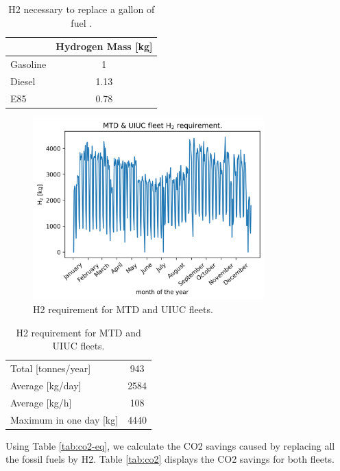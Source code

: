 \documentclass[11pt,letterpaper]{article}
\begin{document}
	\begin{table}[htbp!]
	\centering
	\caption{\gls{H2} necessary to replace a gallon of fuel \cite{doe_office_of_energy_efficiency_and_renewable_energy_hydrogen_2020} \cite{alternative_fuels_data_center_fuel_2014}.}
	\begin{tabular}{l|c}
	    \hline
	 	                 & Hydrogen Mass [kg] \\ \hline
	 	Gasoline         & 1                  \\
	 	Diesel           & 1.13               \\
	 	E85              & 0.78               \\ \hline
	\end{tabular}
	\label{tab:equiv}
	\end{table}

	\begin{figure}[htbp!]
	    \centering
		\includegraphics[height=7.0cm]{figures/hydro-fleet}
		\hfill
		\caption{\gls{H2} requirement for MTD and UIUC fleets.}
		\label{fig:hydro-fleet}
	\end{figure}

	\begin{table}[htbp!]
		\centering
	    \caption{\gls{H2} requirement for MTD and UIUC fleets.}
		\begin{tabular}{l|c}
		\hline
		Total [tonnes/year]     & 943    \\
		Average [kg/day] 	    & 2584   \\
		Average [kg/h] 		    & 108    \\
		Maximum in one day [kg] & 4440   \\ \hline
        \end{tabular}
        \label{tab:hydro-fleet}
	\end{table}

Using Table \ref{tab:co2-eq}, we calculate the \gls{CO2} savings caused by replacing all the fossil fuels by \gls{H2}.
Table \ref{tab:co2} displays the \gls{CO2} savings for both fleets.
\end{document}

